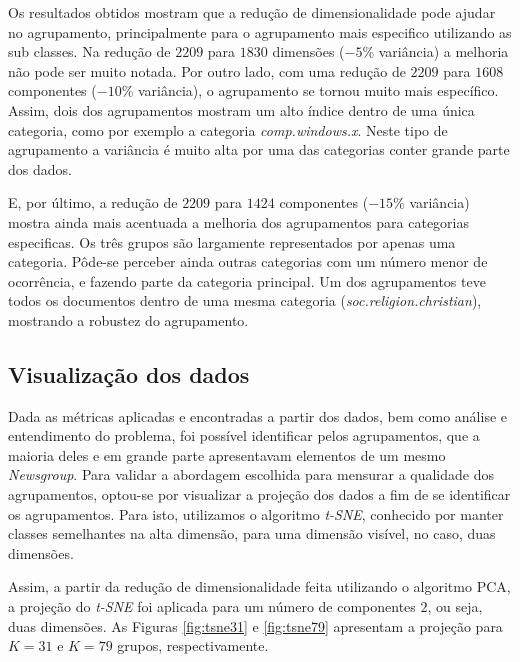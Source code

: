 \documentclass[conference]{IEEEtran}
\begin{document}
Os resultados obtidos mostram que a redução de dimensionalidade pode ajudar no agrupamento, principalmente para o agrupamento mais especifico utilizando as sub classes. Na redução de $2209$ para $1830$ dimensões ($-5\%$ variância) a melhoria não pode ser muito notada. Por outro lado, com uma redução de $2209$ para $1608$ componentes ($-10\%$ variância), o agrupamento se tornou muito mais específico. Assim, dois dos agrupamentos mostram um alto índice dentro de uma única categoria, como por exemplo a categoria \emph{comp.windows.x}. Neste tipo de agrupamento a variância é muito alta por uma das categorias conter grande parte dos dados.

E, por último, a redução de $2209$ para $1424$ componentes ($-15\%$ variância) mostra ainda mais acentuada a melhoria dos agrupamentos para categorias especificas. Os três grupos são largamente representados por apenas uma categoria. Pôde-se perceber ainda outras categorias com um número menor de ocorrência, e fazendo parte da categoria principal. Um dos agrupamentos teve todos os documentos dentro de uma mesma categoria (\emph{soc.religion.christian}), mostrando a robustez do agrupamento.

\subsection{Visualização dos dados}

Dada as métricas aplicadas e encontradas a partir dos dados, bem como análise e entendimento do problema, foi possível identificar pelos agrupamentos, que a maioria deles e em grande parte apresentavam elementos de um mesmo \emph{Newsgroup}. Para validar a abordagem escolhida para mensurar a qualidade dos agrupamentos, optou-se por visualizar a projeção dos dados a fim de se identificar os agrupamentos. Para isto, utilizamos o algoritmo \emph{t-SNE}, conhecido por manter classes semelhantes na alta dimensão, para uma dimensão visível, no caso, duas dimensões.

Assim, a partir da redução de dimensionalidade feita utilizando o algoritmo PCA, a projeção do \emph{t-SNE} foi aplicada para um número de componentes $2$, ou seja, duas dimensões. As Figuras \ref{fig:tsne31} e \ref{fig:tsne79} apresentam a projeção para $K=31$ e $K=79$ grupos, respectivamente.
\end{document}
